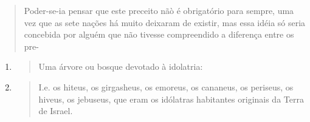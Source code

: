 \begin{quote}
Poder-se-ia pensar que este preceito nãò é obrigatório para sempre, uma
vez que as sete nações há muito deixaram de existir, mas essa idéia só
seria concebida por alguém que não tivesse compreendido a diferença
entre os pre-
\end{quote}

\begin{enumerate}
\def\labelenumi{\arabic{enumi}.}
\setcounter{enumi}{191}
\item
  \begin{quote}
  Uma árvore ou bosque devotado à idolatria:
  \end{quote}
\item
  \begin{quote}
  I.e. os hiteus, os girgasheus, os emoreus, os cananeus, os periseus,
  os hiveus, os jebuseus, que eram os idólatras habitantes originais da
  Terra de Israel.
  \end{quote}
\end{enumerate}

